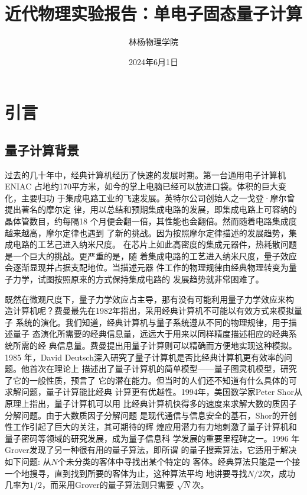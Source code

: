 \documentclass[a4paper]{article}
\title{近代物理实验报告：单电子固态量子计算}
\author{林杨\quad 211840092\quad 物理学院}
\date{2024年6月1日}
\begin{document}
\maketitle


\tableofcontents
\newpage

\section{引言}


\subsection{量子计算背景}
过去的几十年中，经典计算机经历了快速的发展时期。第一台通用电子计算机ENIAC
占地约170平方米，如今的掌上电脑已经可以放进口袋。体积的巨大变化，主要归功
于集成电路工业的飞速发展。英特尔公司创始人之一戈登·摩尔曾提出著名的摩尔定
律，用以总结和预期集成电路的发展，即集成电路上可容纳的晶体管数目，约每隔18
个月便会翻一倍，其性能也会翻倍。然而随着电路集成度越来越高，摩尔定律也遇到
了新的挑战。因为按照摩尔定律描述的发展趋势，集成电路的工艺己进入纳米尺度。
在芯片上如此高密度的集成元器件，热耗散问题是一个巨大的挑战。更严重的是，随
着集成电路的工艺进入纳米尺度，量子效应会逐渐显现并占据支配地位。当描述元器
件工作的物理规律由经典物理转变为量子力学，试图按照原来的方式保持集成电路的
发展趋势就非常困难了。

既然在微观尺度下，量子力学效应占主导，那有没有可能利用量子力学效应来构
造计算机呢？费曼最先在1982年指出，采用经典计算机不可能以有效方式来模拟量子
系统的演化。我们知道，经典计算机与量子系统遵从不同的物理规律，用于描述量子
态演化所需要的经典信息量，远远大于用来以同样精度描述相应的经典系统所需的经
典信息量。费曼提出用量子计算则可以精确而方便地实现这种模拟。1985 年，David
Deutsch深入研究了量子计算机是否比经典计算机更有效率的问题。他首次在理论上
描述出了量子计算机的简单模型——量子图灵机模型，研究了它的一般性质，预言了
它的潜在能力。但当时的人们还不知道有什么具体的可求解问题，量子计算能比经典
计算更有优越性。1994年，美国数学家Peter Shor从原理上指出，量子计算机可以用
比经典计算机快得多的速度来求解大数的质因子分解问题。由于大数质因子分解问题
是现代通信与信息安全的基石，Shor的开创性工作引起了巨大的关注，其可期待的辉
煌应用潜力有力地刺激了量子计算机和量子密码等领域的研究发展，成为量子信息科
学发展的重要里程碑之一。1996 年Grover发现了另一种很有用的量子算法，即所谓
的量子搜索算法，它适用于解决如下问题: 从$ N $个未分类的客体中寻找出某个特定的
客体。经典算法只能是一个接一个地搜寻，直到找到所要的客体为止，这种算法平均
地讲要寻找$ N/2 $次，成功几率为$ 1/2 $，而采用Grover的量子算法则只需要
$ \sqrt{N} $次。
\end{document}
